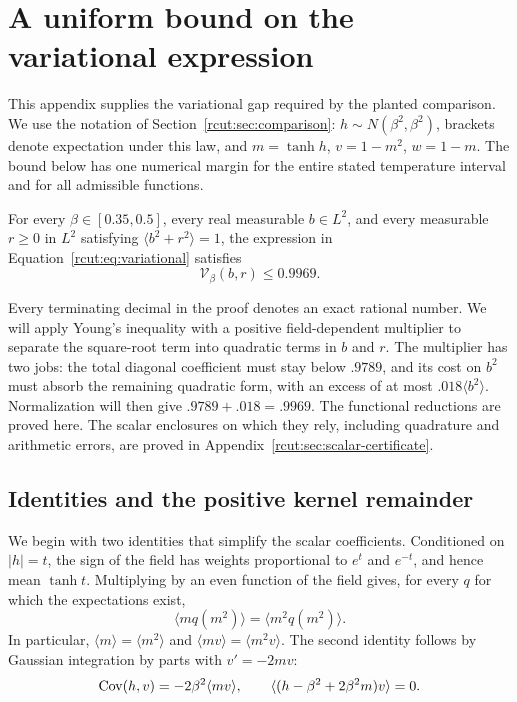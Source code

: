 \section{A uniform bound on the variational expression}
\label{rcut:sec:scalar}

This appendix supplies the variational gap required by the planted
comparison. We use the notation of Section~\ref{rcut:sec:comparison}:
\(h\sim N(\beta^2,\beta^2)\), brackets denote expectation under this law,
and \(m=\tanh h\), \(v=1-m^2\), \(w=1-m\). The bound below has one
numerical margin for the entire stated temperature interval and for all
admissible functions.

\begin{proposition}
\label{rcut:prop:scalar-gap}
For every \(\beta\in[0.35,0.5]\), every real measurable
\(b\in L^2\), and every measurable \(r\geq0\) in \(L^2\) satisfying
\(\langle b^2+r^2\rangle=1\), the expression in
Equation~\eqref{rcut:eq:variational} satisfies
\[
 \mathcal V_\beta(b,r)\leq 0.9969.
\]
\end{proposition}

Every terminating decimal in the proof denotes an exact rational number.
We will apply Young's inequality with a positive field-dependent
multiplier to separate the square-root term into quadratic terms in
\(b\) and \(r\). The multiplier has two jobs: the total diagonal
coefficient must stay below \(.9789\), and its cost on \(b^2\) must
absorb the remaining quadratic form, with an excess of at most
\(.018\langle b^2\rangle\). Normalization will then give
\(.9789+.018=.9969\).
The functional reductions are proved here. The scalar enclosures on
which they rely, including quadrature and arithmetic errors, are proved
in Appendix~\ref{rcut:sec:scalar-certificate}.

\subsection{Identities and the positive kernel remainder}
\label{rcut:sec:scalar-identities}

We begin with two identities that simplify the scalar coefficients.
Conditioned on \(|h|=t\), the sign of the field has weights proportional
to \(e^t\) and \(e^{-t}\), and hence mean \(\tanh t\). Multiplying by
an even function of the field gives, for every \(q\) for which the
expectations exist,
\begin{equation}
 \langle m q(m^2)\rangle=\langle m^2 q(m^2)\rangle.
 \label{rcut:eq:scalar-sign-identity}
\end{equation}
In particular, \(\langle m\rangle=\langle m^2\rangle\) and
\(\langle mv\rangle=\langle m^2v\rangle\).
The second identity follows by Gaussian integration by parts with
\(v'=-2mv\):
\begin{equation}
 \operatorname{Cov}(h,v)=-2\beta^2\langle mv\rangle,
 \qquad
 \langle(h-\beta^2+2\beta^2m)v\rangle=0.
 \label{rcut:eq:scalar-integration-parts}
\end{equation}

